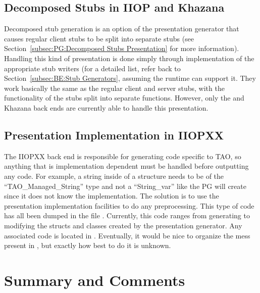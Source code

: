 \subsection{Decomposed Stubs in IIOP and Khazana}
\label{subsec:BE:Decomposed Stubs in IIOP and Khazana}

Decomposed stub generation is an option of the presentation generator that
causes regular client stubs to be split into separate stubs (see
Section~\ref{subsec:PG:Decomposed Stubs Presentation} for more information).
Handling this kind of presentation is done simply through implementation of the
appropriate stub writers (for a detailed list, refer back to
Section~\ref{subsec:BE:Stub Generators}, assuming the runtime can support
it.  They work basically the same as the regular client and server stubs, with
the functionality of the stubs split into separate functions. However, only the
\IIOP{} and Khazana back ends are currently able to handle this presentation.

\subsection{Presentation Implementation in IIOPXX}
\label{subsec:BE:Presentation Implementation in IIOPXX}

The IIOPXX back end is responsible for generating code specific to TAO, so
anything that is implementation dependent must be handled before outputting any
code.  For example, a string inside of a structure needs to be of the
``TAO_Managed_String'' type and not a ``String_var'' like the PG will create
since it does not know the implementation.  The solution is to use the
presentation implementation facilities to do any preprocessing.  This type of
code has all been dumped in the file .
Currently, this code ranges from generating  to
modifying the structs and classes created by the presentation generator.  Any
associated \SCML{} code is located in
.  Eventually, it would be nice
to organize the mess present in , but exactly how best to
do it is unknown.



\section{Summary and Comments}
\label{sec:BE:Summary and Comments}

